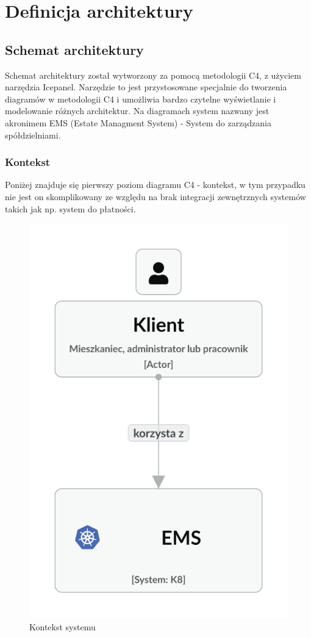 \newpage
\section{Definicja architektury}
\subsection{Schemat architektury}
Schemat architektury został wytworzony za pomocą metodologii C4, z użyciem narzędzia Icepanel. Narzędzie to jest przystosowane specjalnie do tworzenia diagramów w metodologii C4 i umożliwia bardzo czytelne wyświetlanie i modelowanie różnych architektur. Na diagramach system nazwany jest akronimem EMS (Estate Managment System) - System do zarządzania spółdzielniami.
\subsubsection{Kontekst}
Poniżej znajduje się pierwszy poziom diagramu C4 - kontekst, w tym przypadku nie jest on skomplikowany ze względu na brak integracji zewnętrznych systemów takich jak np. system do płatności.
\begin{figure}[H]
    \centering
    \includegraphics[width=0.5\linewidth]{img/Context_Diagram.png}
    \caption{Kontekst systemu}
    \label{fig:context-diag}
\end{figure}

